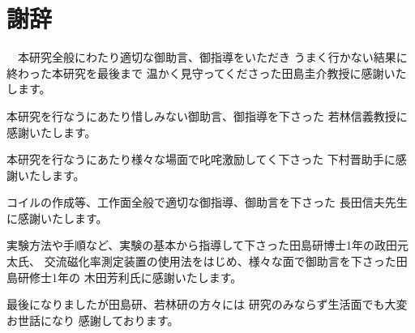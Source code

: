 \chapter{謝辞}

　本研究全般にわたり適切な御助言、御指導をいただき
うまく行かない結果に終わった本研究を最後まで
温かく見守ってくださった田島圭介教授に感謝いたします。

本研究を行なうにあたり惜しみない御助言、御指導を下さった
若林信義教授に感謝いたします。

本研究を行なうにあたり様々な場面で叱咤激励してく下さった
下村晋助手に感謝いたします。

コイルの作成等、工作面全般で適切な御指導、御助言を下さった
長田信夫先生に感謝いたします。

実験方法や手順など、実験の基本から指導して下さった田島研博士1年の政田元太氏、
交流磁化率測定装置の使用法をはじめ、様々な面で御助言を下さった田島研修士1年の
木田芳利氏に感謝いたします。

最後になりましたが田島研、若林研の方々には
研究のみならず生活面でも大変お世話になり
感謝しております。



